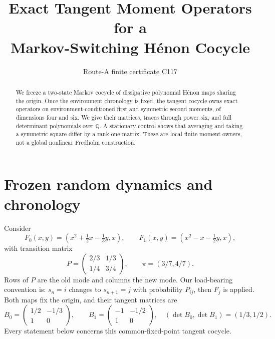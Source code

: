 \documentclass[10pt]{article}
\title{Exact Tangent Moment Operators for a\\ Markov-Switching H\'enon Cocycle}
\author{Route-A finite certificate C117}
\date{}
\begin{document}
\maketitle
\begin{abstract}
We freeze a two-state Markov cocycle of dissipative polynomial H\'enon maps
sharing the origin.  Once the environment chronology is fixed, the tangent
cocycle owns exact operators on environment-conditioned first and symmetric
second moments, of dimensions four and six.  We give their matrices, traces
through power six, and full determinant polynomials over $\mathbb Q$.  A
stationary control shows that averaging and taking a symmetric square differ
by a rank-one matrix.  These are local finite moment owners, not a global
nonlinear Fredholm construction.
\end{abstract}

\section{Frozen random dynamics and chronology}
Consider
\[
 F_0(x,y)=(x^2+\tfrac12x-\tfrac13y,x),\qquad
 F_1(x,y)=(x^2-x-\tfrac12y,x),
\]
with transition matrix
\[
 P=\begin{pmatrix}2/3&1/3\\1/4&3/4\end{pmatrix},\qquad
 \pi=(3/7,4/7).
\]
Rows of $P$ are the old mode and columns the new mode.  Our load-bearing
convention is: $s_n=i$ changes to $s_{n+1}=j$ with probability $P_{ij}$,
then $F_j$ is applied.  Both maps fix the origin, and their tangent matrices
are
\[
 B_0=\begin{pmatrix}1/2&-1/3\\1&0\end{pmatrix},\qquad
 B_1=\begin{pmatrix}-1&-1/2\\1&0\end{pmatrix},
 \quad (\det B_0,\det B_1)=(1/3,1/2).
\]
Every statement below concerns this common-fixed-point tangent cocycle.
\end{document}
